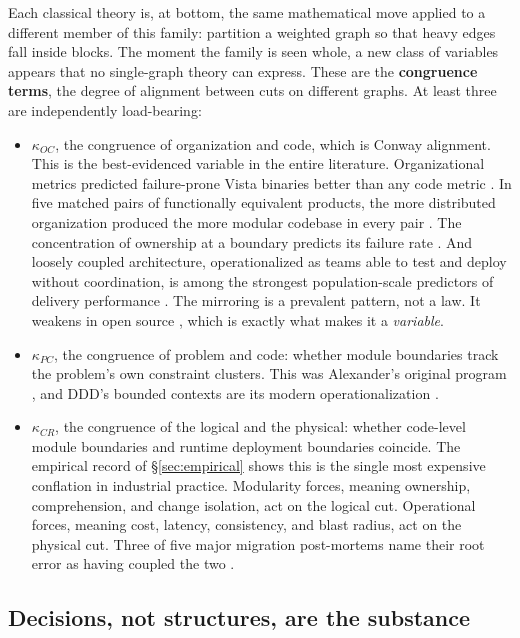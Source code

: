 \documentclass[11pt,oneside]{article}
\theoremstyle{definition}
\begin{document}
Each classical theory is, at bottom, the same mathematical move applied to a different member of
this family: partition a weighted graph so that heavy edges fall inside blocks. The moment the
family is seen whole, a new class of variables appears that no single-graph theory can express.
These are the \textbf{congruence terms}, the degree of alignment between cuts on different
graphs. At least three are independently load-bearing:

\begin{itemize}[leftmargin=1.6em]
\item $\kappa_{OC}$, the congruence of organization and code, which is Conway alignment. This is
the best-evidenced variable in the entire literature. Organizational metrics predicted
failure-prone Vista binaries better than any code metric \cite{nagappan2008}. In five matched
pairs of functionally equivalent products, the more distributed organization produced the more
modular codebase in every pair \cite{maccormack2012}. The concentration of ownership at a
boundary predicts its failure rate \cite{bird2011}. And loosely coupled architecture,
operationalized as teams able to test and deploy without coordination, is among the strongest
population-scale predictors of delivery performance \cite{accelerate2018}. The mirroring is a
prevalent pattern, not a law. It weakens in open source \cite{colferbaldwin2016}, which is
exactly what makes it a \emph{variable}.
\item $\kappa_{PC}$, the congruence of problem and code: whether module boundaries track the
problem's own constraint clusters. This was Alexander's original program \cite{alexander1964},
and DDD's bounded contexts are its modern operationalization \cite{evans2003}.
\item $\kappa_{CR}$, the congruence of the logical and the physical: whether code-level module
boundaries and runtime deployment boundaries coincide. The empirical record of
\S\ref{sec:empirical} shows this is the single most expensive conflation in industrial practice.
Modularity forces, meaning ownership, comprehension, and change isolation, act on the logical
cut. Operational forces, meaning cost, latency, consistency, and blast radius, act on the
physical cut. Three of five major migration post-mortems name their root error as having coupled
the two \cite{primevideo2023,shopify2019,uberdoma2020}.
\end{itemize}

\subsection{Decisions, not structures, are the substance}
\end{document}
